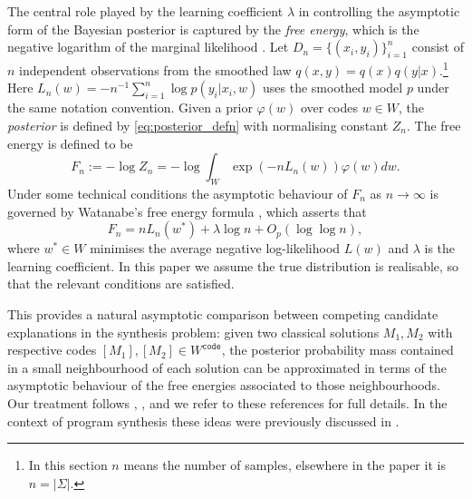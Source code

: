 \documentclass[english,letter paper,12pt,reqno]{article}
\theoremstyle{definition}
\begin{document}
The central role played by the learning coefficient $\lambda$ in controlling the asymptotic form of the Bayesian posterior is captured by the \emph{free energy}, which is the negative logarithm of the marginal likelihood \cite{watanabeAlgebraicGeometryStatistical2009}. Let $D_n = \{ (x_i, y_i) \}_{i=1}^n$ consist of $n$ independent observations from the smoothed law $q(x,y) = q(x)q(y|x)$.\footnote{In this section $n$ means the number of samples, elsewhere in the paper it is $n = |\Sigma|$.} Here $L_n(w) = -n^{-1}\sum_{i=1}^n \log p(y_i|x_i,w)$ uses the smoothed model $p$ under the same notation convention. Given a prior $\varphi(w)$ over codes $w \in W$, the \emph{posterior} is defined by \eqref{eq:posterior_defn} with normalising constant $Z_n$. The free energy is defined to be
\begin{equation}
    F_n := -\log Z_n = -\log \int_W \exp(-n L_n(w)) \varphi(w) dw.
\end{equation}
Under some technical conditions the asymptotic behaviour of $F_n$ as $n \to \infty$ is governed by Watanabe's free energy formula \cite[\S 6.3]{watanabe2018}, which asserts that
\begin{equation}\label{eq:free_energy_formula_programs}
    F_n = n L_n(w^*) + \lambda \log n + O_p(\log \log n),
\end{equation}
where $w^* \in W$ minimises the average negative log-likelihood $L(w)$ and $\lambda$ is the learning coefficient. In this paper we assume the true distribution is realisable, so that the relevant conditions are satisfied.

This provides a natural asymptotic comparison between competing candidate explanations in the synthesis problem: given two classical solutions $M_1, M_2$ with respective codes $[M_1], [M_2] \in W^{\texttt{code}}$, the posterior probability mass contained in a small neighbourhood of each solution can be approximated in terms of the asymptotic behaviour of the free energies associated to those neighbourhoods. Our treatment follows \cite[\S 7.6]{watanabeAlgebraicGeometryStatistical2009}, \cite{watanabephasetalk}, \cite{chen2023tms1} and we refer to these references for full details. In the context of program synthesis these ideas were previously discussed in \cite{clift2021geometry, waring2021geometric}.
\\
\end{document}
